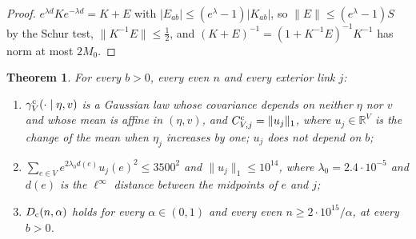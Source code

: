 \documentclass[11pt]{amsart}
\newtheorem{theorem}{Theorem}[section]
\theoremstyle{definition}
\theoremstyle{remark}
\numberwithin{equation}{section}
\newcommand{\R}{\mathbb{R}}
\begin{document}
\begin{proof}
$e^{\lambda d}Ke^{-\lambda d}=K+E$ with $|E_{ab}|\le(e^\lambda-1)|K_{ab}|$,
so $\|E\|\le(e^\lambda-1)S$ by the Schur test, $\|K^{-1}E\|\le\frac12$, and
$(K+E)^{-1}=(1+K^{-1}E)^{-1}K^{-1}$ has norm at most $2M_0$.
\end{proof}

\begin{theorem}\label{thm:constrainedcube}
For every $b>0$, every even $n$ and every exterior link $j$:
\begin{enumerate}[label=\textup{(\roman*)},leftmargin=*]
\item $\gamma^{\rm c}_V(\cdot\mid\eta,v)$ is a Gaussian law whose covariance
depends on neither $\eta$ nor $v$ and whose mean is affine in $(\eta,v)$, and
$C^{\rm c}_{V,j}=\|u_j\|_1$, where $u_j\in\R^V$ is the change of the mean when
$\eta_j$ increases by one; $u_j$ does not depend on $b$;
\item $\sum_{e\in V}e^{2\lambda_0d(e)}u_j(e)^2\le3500^2$ and $\|u_j\|_1\le
10^{14}$, where $\lambda_0=2.4\cdot10^{-5}$ and $d(e)$ is the $\ell^\infty$
distance between the midpoints of $e$ and $j$;
\item $D_{\rm c}(n,\alpha)$ holds for every $\alpha\in(0,1)$ and every even
$n\ge2\cdot10^{15}/\alpha$, at every $b>0$.
\end{enumerate}
\end{theorem}
\end{document}
